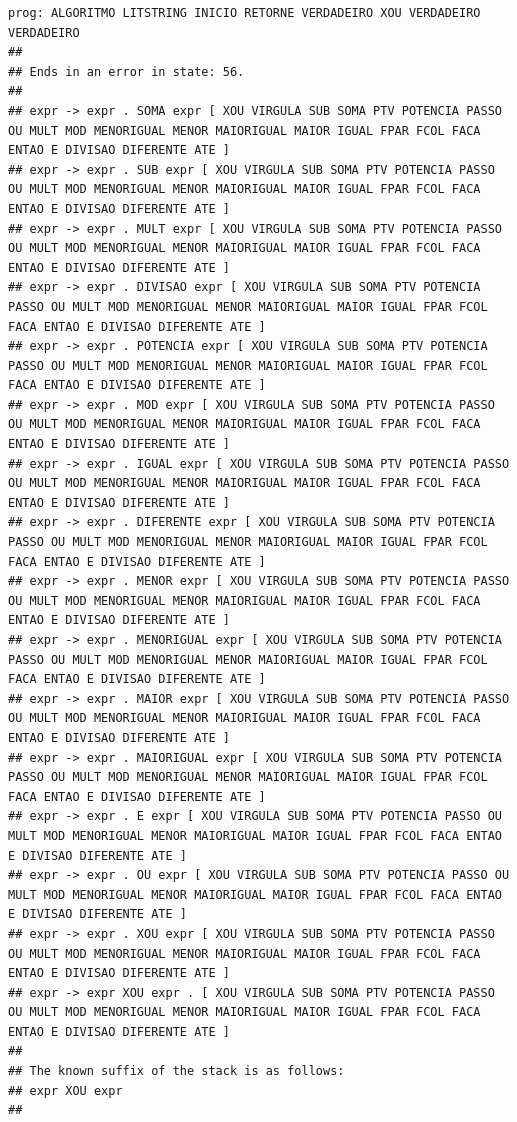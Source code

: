 \documentclass[hidelinks,12pt]{article}
\begin{document}
\begin{lstlisting}
prog: ALGORITMO LITSTRING INICIO RETORNE VERDADEIRO XOU VERDADEIRO VERDADEIRO 
##
## Ends in an error in state: 56.
##
## expr -> expr . SOMA expr [ XOU VIRGULA SUB SOMA PTV POTENCIA PASSO OU MULT MOD MENORIGUAL MENOR MAIORIGUAL MAIOR IGUAL FPAR FCOL FACA ENTAO E DIVISAO DIFERENTE ATE ]
## expr -> expr . SUB expr [ XOU VIRGULA SUB SOMA PTV POTENCIA PASSO OU MULT MOD MENORIGUAL MENOR MAIORIGUAL MAIOR IGUAL FPAR FCOL FACA ENTAO E DIVISAO DIFERENTE ATE ]
## expr -> expr . MULT expr [ XOU VIRGULA SUB SOMA PTV POTENCIA PASSO OU MULT MOD MENORIGUAL MENOR MAIORIGUAL MAIOR IGUAL FPAR FCOL FACA ENTAO E DIVISAO DIFERENTE ATE ]
## expr -> expr . DIVISAO expr [ XOU VIRGULA SUB SOMA PTV POTENCIA PASSO OU MULT MOD MENORIGUAL MENOR MAIORIGUAL MAIOR IGUAL FPAR FCOL FACA ENTAO E DIVISAO DIFERENTE ATE ]
## expr -> expr . POTENCIA expr [ XOU VIRGULA SUB SOMA PTV POTENCIA PASSO OU MULT MOD MENORIGUAL MENOR MAIORIGUAL MAIOR IGUAL FPAR FCOL FACA ENTAO E DIVISAO DIFERENTE ATE ]
## expr -> expr . MOD expr [ XOU VIRGULA SUB SOMA PTV POTENCIA PASSO OU MULT MOD MENORIGUAL MENOR MAIORIGUAL MAIOR IGUAL FPAR FCOL FACA ENTAO E DIVISAO DIFERENTE ATE ]
## expr -> expr . IGUAL expr [ XOU VIRGULA SUB SOMA PTV POTENCIA PASSO OU MULT MOD MENORIGUAL MENOR MAIORIGUAL MAIOR IGUAL FPAR FCOL FACA ENTAO E DIVISAO DIFERENTE ATE ]
## expr -> expr . DIFERENTE expr [ XOU VIRGULA SUB SOMA PTV POTENCIA PASSO OU MULT MOD MENORIGUAL MENOR MAIORIGUAL MAIOR IGUAL FPAR FCOL FACA ENTAO E DIVISAO DIFERENTE ATE ]
## expr -> expr . MENOR expr [ XOU VIRGULA SUB SOMA PTV POTENCIA PASSO OU MULT MOD MENORIGUAL MENOR MAIORIGUAL MAIOR IGUAL FPAR FCOL FACA ENTAO E DIVISAO DIFERENTE ATE ]
## expr -> expr . MENORIGUAL expr [ XOU VIRGULA SUB SOMA PTV POTENCIA PASSO OU MULT MOD MENORIGUAL MENOR MAIORIGUAL MAIOR IGUAL FPAR FCOL FACA ENTAO E DIVISAO DIFERENTE ATE ]
## expr -> expr . MAIOR expr [ XOU VIRGULA SUB SOMA PTV POTENCIA PASSO OU MULT MOD MENORIGUAL MENOR MAIORIGUAL MAIOR IGUAL FPAR FCOL FACA ENTAO E DIVISAO DIFERENTE ATE ]
## expr -> expr . MAIORIGUAL expr [ XOU VIRGULA SUB SOMA PTV POTENCIA PASSO OU MULT MOD MENORIGUAL MENOR MAIORIGUAL MAIOR IGUAL FPAR FCOL FACA ENTAO E DIVISAO DIFERENTE ATE ]
## expr -> expr . E expr [ XOU VIRGULA SUB SOMA PTV POTENCIA PASSO OU MULT MOD MENORIGUAL MENOR MAIORIGUAL MAIOR IGUAL FPAR FCOL FACA ENTAO E DIVISAO DIFERENTE ATE ]
## expr -> expr . OU expr [ XOU VIRGULA SUB SOMA PTV POTENCIA PASSO OU MULT MOD MENORIGUAL MENOR MAIORIGUAL MAIOR IGUAL FPAR FCOL FACA ENTAO E DIVISAO DIFERENTE ATE ]
## expr -> expr . XOU expr [ XOU VIRGULA SUB SOMA PTV POTENCIA PASSO OU MULT MOD MENORIGUAL MENOR MAIORIGUAL MAIOR IGUAL FPAR FCOL FACA ENTAO E DIVISAO DIFERENTE ATE ]
## expr -> expr XOU expr . [ XOU VIRGULA SUB SOMA PTV POTENCIA PASSO OU MULT MOD MENORIGUAL MENOR MAIORIGUAL MAIOR IGUAL FPAR FCOL FACA ENTAO E DIVISAO DIFERENTE ATE ]
##
## The known suffix of the stack is as follows:
## expr XOU expr 
##


\end{lstlisting}
\end{document}
